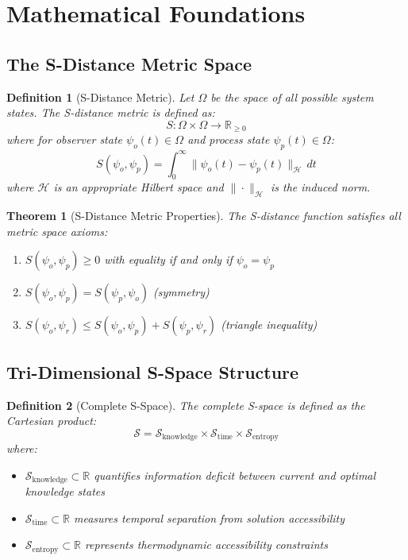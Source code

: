 \documentclass[11pt]{article}
\newtheorem{theorem}{Theorem}
\newtheorem{definition}{Definition}
\begin{document}
\section{Mathematical Foundations}

\subsection{The S-Distance Metric Space}

\begin{definition}[S-Distance Metric]
Let $\Omega$ be the space of all possible system states. The S-distance metric is defined as:
\begin{equation}
S: \Omega \times \Omega \to \mathbb{R}_{\geq 0}
\end{equation}
where for observer state $\psi_o(t) \in \Omega$ and process state $\psi_p(t) \in \Omega$:
\begin{equation}
S(\psi_o, \psi_p) = \int_0^{\infty} \|\psi_o(t) - \psi_p(t)\|_{\mathcal{H}} \, dt
\label{eq:s_distance}
\end{equation}
where $\mathcal{H}$ is an appropriate Hilbert space and $\|\cdot\|_{\mathcal{H}}$ is the induced norm.
\end{definition}

\begin{theorem}[S-Distance Metric Properties]
The S-distance function satisfies all metric space axioms:
\begin{enumerate}
\item $S(\psi_o, \psi_p) \geq 0$ with equality if and only if $\psi_o = \psi_p$
\item $S(\psi_o, \psi_p) = S(\psi_p, \psi_o)$ (symmetry)
\item $S(\psi_o, \psi_r) \leq S(\psi_o, \psi_p) + S(\psi_p, \psi_r)$ (triangle inequality)
\end{enumerate}
\end{theorem}

\subsection{Tri-Dimensional S-Space Structure}

\begin{definition}[Complete S-Space]
The complete S-space is defined as the Cartesian product:
\begin{equation}
\mathcal{S} = \mathcal{S}_{\text{knowledge}} \times \mathcal{S}_{\text{time}} \times \mathcal{S}_{\text{entropy}}
\end{equation}
where:
\begin{itemize}
\item $\mathcal{S}_{\text{knowledge}} \subset \mathbb{R}$ quantifies information deficit between current and optimal knowledge states
\item $\mathcal{S}_{\text{time}} \subset \mathbb{R}$ measures temporal separation from solution accessibility  
\item $\mathcal{S}_{\text{entropy}} \subset \mathbb{R}$ represents thermodynamic accessibility constraints
\end{itemize}
\end{definition}
\end{document}
